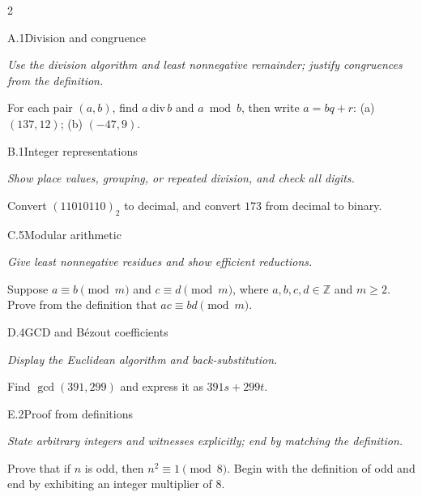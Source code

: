 \documentclass[9pt]{extarticle}
\begin{document}
\begin{multicols}{2}
\begin{CoreProblem}{A.1}{Division and congruence}
{\scriptsize\textit{Use the division algorithm and least nonnegative remainder; justify congruences from the definition.}\par}
For each pair $(a,b)$, find $a\,\mathrm{div}\,b$ and $a\bmod b$, then write
$a=bq+r$: (a) $(137,12)$; (b) $(-47,9)$.
\end{CoreProblem}
\begin{CoreProblem}{B.1}{Integer representations}
{\scriptsize\textit{Show place values, grouping, or repeated division, and check all digits.}\par}
Convert $(11010110)_2$ to decimal, and convert $173$ from decimal to binary.
\end{CoreProblem}
\begin{CoreProblem}{C.5}{Modular arithmetic}
{\scriptsize\textit{Give least nonnegative residues and show efficient reductions.}\par}
Suppose $a\equiv b\pmod m$ and $c\equiv d\pmod m$, where
$a,b,c,d\in\mathbb Z$ and $m\ge2$. Prove from the definition that
$ac\equiv bd\pmod m$.
\end{CoreProblem}
\columnbreak
\begin{CoreProblem}{D.4}{GCD and B\'ezout coefficients}
{\scriptsize\textit{Display the Euclidean algorithm and back-substitution.}\par}
Find $\gcd(391,299)$ and express it as $391s+299t$.
\end{CoreProblem}
\begin{CoreProblem}{E.2}{Proof from definitions}
{\scriptsize\textit{State arbitrary integers and witnesses explicitly; end by matching the definition.}\par}
Prove that if $n$ is odd, then $n^2\equiv1\pmod{8}$. Begin with the definition
of odd and end by exhibiting an integer multiplier of $8$.
\end{CoreProblem}
\end{multicols}
\CoreWorkArea
\FormBreak
{}
\end{document}
